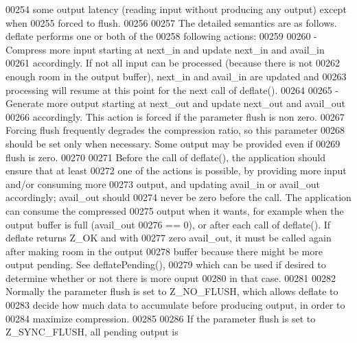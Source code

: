 \begin{DoxyCode}
00254 \textcolor{comment}{  some output latency (reading input without producing any output) except when}
00255 \textcolor{comment}{  forced to flush.}
00256 \textcolor{comment}{}
00257 \textcolor{comment}{    The detailed semantics are as follows.  deflate performs one or both of the}
00258 \textcolor{comment}{  following actions:}
00259 \textcolor{comment}{}
00260 \textcolor{comment}{  - Compress more input starting at next\_in and update next\_in and avail\_in}
00261 \textcolor{comment}{    accordingly.  If not all input can be processed (because there is not}
00262 \textcolor{comment}{    enough room in the output buffer), next\_in and avail\_in are updated and}
00263 \textcolor{comment}{    processing will resume at this point for the next call of deflate().}
00264 \textcolor{comment}{}
00265 \textcolor{comment}{  - Generate more output starting at next\_out and update next\_out and avail\_out}
00266 \textcolor{comment}{    accordingly.  This action is forced if the parameter flush is non zero.}
00267 \textcolor{comment}{    Forcing flush frequently degrades the compression ratio, so this parameter}
00268 \textcolor{comment}{    should be set only when necessary.  Some output may be provided even if}
00269 \textcolor{comment}{    flush is zero.}
00270 \textcolor{comment}{}
00271 \textcolor{comment}{    Before the call of deflate(), the application should ensure that at least}
00272 \textcolor{comment}{  one of the actions is possible, by providing more input and/or consuming more}
00273 \textcolor{comment}{  output, and updating avail\_in or avail\_out accordingly; avail\_out should}
00274 \textcolor{comment}{  never be zero before the call.  The application can consume the compressed}
00275 \textcolor{comment}{  output when it wants, for example when the output buffer is full (avail\_out}
00276 \textcolor{comment}{  == 0), or after each call of deflate().  If deflate returns Z\_OK and with}
00277 \textcolor{comment}{  zero avail\_out, it must be called again after making room in the output}
00278 \textcolor{comment}{  buffer because there might be more output pending. See deflatePending(),}
00279 \textcolor{comment}{  which can be used if desired to determine whether or not there is more ouput}
00280 \textcolor{comment}{  in that case.}
00281 \textcolor{comment}{}
00282 \textcolor{comment}{    Normally the parameter flush is set to Z\_NO\_FLUSH, which allows deflate to}
00283 \textcolor{comment}{  decide how much data to accumulate before producing output, in order to}
00284 \textcolor{comment}{  maximize compression.}
00285 \textcolor{comment}{}
00286 \textcolor{comment}{    If the parameter flush is set to Z\_SYNC\_FLUSH, all pending output is}

\end{DoxyCode}
